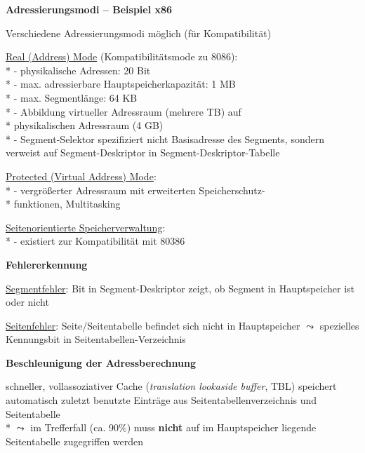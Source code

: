 \textbf{Adressierungsmodi -- Beispiel x86}
\begin{items}
  \item Verschiedene Adressierungsmodi möglich (für Kompatibilität)
  \item \underline{Real (Address) Mode} (Kompatibilitätsmode zu 8086): \\*
    - physikalische Adressen: 20 Bit \\*
    - max. adressierbare Hauptspeicherkapazität: 1 MB \\*
    - max. Segmentlänge: 64 KB \\*
    - Abbildung virtueller Adressraum (mehrere TB) auf \\* \phantom{-} physikalischen Adressraum (4 GB) \\*
    - Segment-Selektor spezifiziert nicht Basisadresse des Segments, sondern verweist auf Segment-Deskriptor in Segment-Deskriptor-Tabelle
  \item \underline{Protected (Virtual Address) Mode}: \\*
    - vergrößerter Adressraum mit erweiterten Speicherschutz- \\* \phantom{-} funktionen, Multitasking
  \item \underline{Seitenorientierte Speicherverwaltung}: \\*
    - existiert zur Kompatibilität mit 80386
\end{items}

\textbf{Fehlererkennung}
\begin{items}
  \item \underline{Segmentfehler}: Bit in Segment-Deskriptor zeigt, ob Segment in Hauptspeicher ist oder nicht
  \item \underline{Seitenfehler}: Seite/Seitentabelle befindet sich nicht in Hauptspeicher \( \leadsto \) spezielles Kennungsbit in Seitentabellen-Verzeichnis
\end{items}

\textbf{Beschleunigung der Adressberechnung}
\begin{items}
  \item schneller, vollassoziativer Cache (\emph{translation lookaside buffer}, TBL) speichert automatisch zuletzt benutzte Einträge aus Seitentabellenverzeichnis und Seitentabelle \\*
  \( \leadsto \) im Trefferfall (ca. 90\%) muss \textbf{nicht} auf im Hauptspeicher liegende Seitentabelle zugegriffen werden
\end{items}

